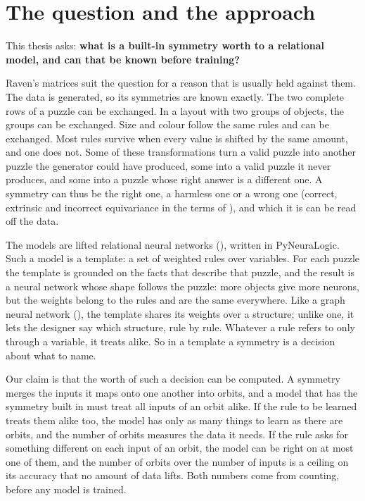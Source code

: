 \section{The question and the approach}\label{sec:1.2}

This thesis asks: \textbf{what is a built-in symmetry worth to a relational model, and can that be known before training?}

Raven's matrices suit the question for a reason that is usually held against them. The data is generated, so its symmetries are known exactly. The two complete rows of a puzzle can be exchanged. In a layout with two groups of objects, the groups can be exchanged. Size and colour follow the same rules and can be exchanged. Most rules survive when every value is shifted by the same amount, and one does not. Some of these transformations turn a valid puzzle into another puzzle the generator could have produced, some into a valid puzzle it never produces, and some into a puzzle whose right answer is a different one. A symmetry can thus be the right one, a harmless one or a wrong one (correct, extrinsic and incorrect equivariance in the terms of \citealp{wang2023general}), and which it is can be read off the data.

The models are lifted relational neural networks (\citealp{sourek2021beyond}), written in PyNeuraLogic. Such a model is a template: a set of weighted rules over variables. For each puzzle the template is grounded on the facts that describe that puzzle, and the result is a neural network whose shape follows the puzzle: more objects give more neurons, but the weights belong to the rules and are the same everywhere. Like a graph neural network (\citealp{zhou2020graph}), the template shares its weights over a structure; unlike one, it lets the designer say which structure, rule by rule. Whatever a rule refers to only through a variable, it treats alike. So in a template a symmetry is a decision about what to name.

Our claim is that the worth of such a decision can be computed. A symmetry merges the inputs it maps onto one another into orbits, and a model that has the symmetry built in must treat all inputs of an orbit alike. If the rule to be learned treats them alike too, the model has only as many things to learn as there are orbits, and the number of orbits measures the data it needs. If the rule asks for something different on each input of an orbit, the model can be right on at most one of them, and the number of orbits over the number of inputs is a ceiling on its accuracy that no amount of data lifts. Both numbers come from counting, before any model is trained.

